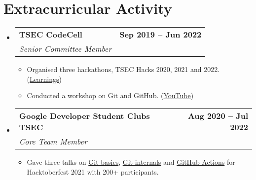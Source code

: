 \documentclass[letterpaper,11pt]{article}
\makeatletter
\newcommand{\resumeItem}[1]{
  \item\small{
    {#1 \vspace{-2pt}}
  }
}
\newcommand{\resumeSubheading}[4]{
  \vspace{-2pt}\item
    \begin{tabular*}{1.0\textwidth}[t]{l@{\extracolsep{\fill}}r}
      \vspace{-2pt}\textbf{#1} & \textbf{\small #2} \\
      \textit{\small#3} & \textit{\small #4} \\
    \end{tabular*}\vspace{-7pt}
}
\newcommand{\resumeSubHeadingListStart}{\begin{itemize}[leftmargin=0.0in, label={}]}
\newcommand{\resumeSubHeadingListEnd}{\end{itemize}}
\newcommand{\resumeItemListStart}{\begin{itemize}}
\newcommand{\resumeItemListEnd}{\end{itemize}\vspace{-5pt}}
\makeatother
\begin{document}
\section{Extracurricular Activity}
    \vspace{-2pt}
    \resumeSubHeadingListStart
        \resumeSubheading
            {TSEC CodeCell}{Sep 2019 -- Jun 2022}
            {Senior Committee Member}{}
            \vspace{-7pt}
            \resumeItemListStart
                \resumeItem{Organised three hackathons, TSEC Hacks 2020, 2021 and 2022. (\href{https://blog.harshkapadia.me/2022/hackathon-team-attitude}{Learnings})}
                \resumeItem{Conducted a workshop on Git and GitHub. (\href{https://www.youtube.com/watch?v=ArOKEf8nkfw}{YouTube})}
            \resumeItemListEnd
        \vspace{-4pt}

        \resumeSubheading
            {Google Developer Student Clubs TSEC}{Aug 2020 -- Jul 2022}
            {Core Team Member}{}
            \vspace{-7pt}
            \resumeItemListStart
                \resumeItem{Gave three talks on \href{https://gdsc.community.dev/events/details/developer-student-clubs-thadomal-shahani-engineering-college-mumbai-presents-git-and-github-workshop}{Git basics}, \href{https://gdsc.community.dev/events/details/developer-student-clubs-thadomal-shahani-engineering-college-mumbai-presents-git-internals-how-does-git-work}{Git internals} and \href{https://gdsc.community.dev/events/details/developer-student-clubs-thadomal-shahani-engineering-college-mumbai-presents-working-with-cicd-github-actions}{GitHub Actions} for Hacktoberfest 2021 with 200+ participants.}
            \resumeItemListEnd
    \resumeSubHeadingListEnd
\vspace{-8pt}
\end{document}
